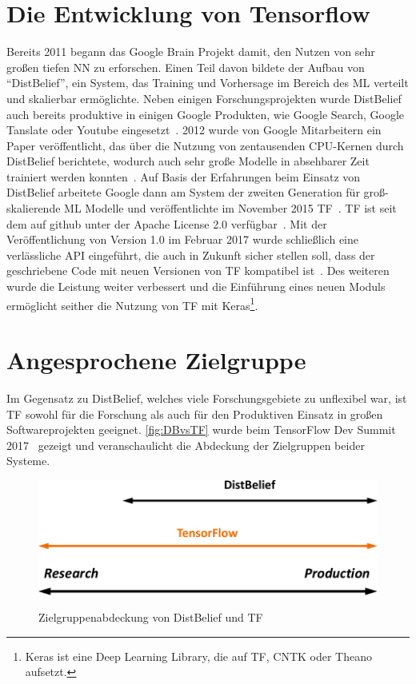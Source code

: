 \section{Die Entwicklung von Tensorflow}
Bereits 2011 begann das Google Brain Projekt damit, den Nutzen von sehr großen tiefen \gls{NN} zu erforschen. Einen Teil davon bildete der Aufbau von "`DistBelief"', ein System, das Training und Vorhersage im Bereich des \gls{ML} verteilt und skalierbar ermöglichte. Neben einigen Forschungsprojekten wurde DistBelief auch bereits produktive in einigen Google Produkten, wie Google Search, Google Tanslate oder Youtube eingesetzt~\cite{tensorflow2016-whitepaper}. 2012 wurde von Google Mitarbeitern ein Paper veröffentlicht, das über die Nutzung von zentausenden CPU-Kernen  durch DistBelief berichtete, wodurch auch sehr große Modelle in absehbarer Zeit trainiert werden konnten~\cite{NIPS2012}. Auf Basis der Erfahrungen beim Einsatz von DistBelief arbeitete Google dann am System der zweiten Generation für groß-skalierende \gls{ML} Modelle und veröffentlichte im November 2015 \gls{TF}~\cite{tf-opensource}. \gls{TF} ist seit dem auf github unter der Apache License 2.0 verfügbar~\cite{tf-git}.  Mit der Veröffentlichung von Version 1.0 im Februar 2017 wurde schließlich eine verlässliche API eingeführt, die auch in Zukunft sicher stellen soll, dass der geschriebene Code mit neuen Versionen von \gls{TF} kompatibel ist~\cite{tf1}. Des weiteren wurde die Leistung weiter verbessert und die Einführung eines neuen Moduls ermöglicht seither die Nutzung von \gls{TF} mit Keras\footnote{Keras ist eine Deep Learning Library, die auf \gls{TF}, CNTK oder Theano aufsetzt.}.

\section{Angesprochene Zielgruppe}
Im Gegensatz zu DistBelief, welches viele Forschungsgebiete zu unflexibel war, ist \gls{TF} sowohl für die Forschung als auch für den Produktiven Einsatz in großen Softwareprojekten geeignet. \autoref{fig:DBvsTF} wurde beim TensorFlow Dev Summit 2017~\cite{tf-sum17-keynote} gezeigt und veranschaulicht die Abdeckung der Zielgruppen beider Systeme.

\begin{figure}[htb!]
	\centering
	 \includegraphics[width=.7\textwidth]{images/DistBeliefvsTensorFlow.pdf}\\
	\vspace{10pt} 
	\caption{Zielgruppenabdeckung von DistBelief und \gls{TF}~\cite{tf-sum17-keynote}}
	\label{fig:DBvsTF}
\end{figure}

